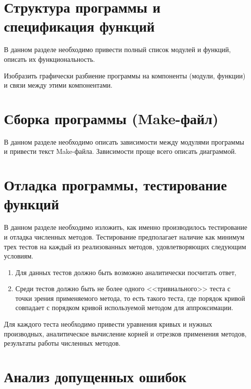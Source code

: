 \documentclass[a4paper,12pt,titlepage,final]{article}
\begin{document}
\newpage

\section{Структура программы и спецификация функций}

В данном разделе необходимо привести полный список модулей и функций,
описать их функциональность.

Изобразить графически разбиение программы на компоненты (модули, функции)
и связи между этими компонентами.

\newpage

\section{Сборка программы (Make-файл)}

В данном разделе необходимо описать зависимости между модулями программы
и привести текст Make-файла. Зависимости проще всего описать диаграммой.

\newpage

\section{Отладка программы, тестирование функций}

В данном разделе необходимо изложить, как именно производилось тестирование
и отладка численных методов. Тестирование предполагает наличие как минимум
трех тестов на каждый из реализованных методов, удовлетворяющих следующим
условиям.
\begin{enumerate}
\item Для данных тестов должно быть возможно аналитически посчитать ответ,
\item Среди тестов должно быть не более одного <<тривиального>> теста
    с точки зрения применяемого метода, то есть такого теста, где порядок
    кривой совпадает с порядком кривой используемой методом для аппроксимации.
\end{enumerate}

Для каждого теста необходимо привести уравнения кривых и нужных производных,
аналитическое вычисление корней и отрезков применения методов, результаты
работы численных методов.

\newpage

\section{Анализ допущенных ошибок}
\end{document}
